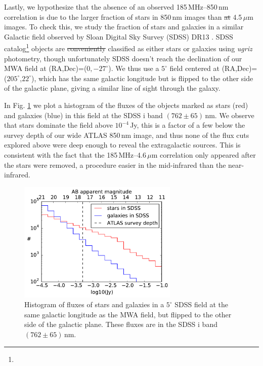 \documentclass[numberedappendix]{emulateapj}
\providecommand{\DIFadd}[1]{{\protect\color{blue}\uwave{#1}}} %
\providecommand{\DIFdel}[1]{{\protect\color{red}\sout{#1}}}                      %
\providecommand{\DIFaddbegin}{} %
\providecommand{\DIFaddend}{} %
\providecommand{\DIFdelbegin}{} %
\providecommand{\DIFdelend}{} %
\begin{document}
Lastly, we hypothesize that the absence of an observed 185\,MHz--850\,nm correlation is due to the larger fraction of stars in 850\,nm images than \DIFdelbegin \DIFdel{at }\DIFdelend \DIFaddbegin \DIFadd{in }\DIFaddend 4.5\,$\mu$m images. To check this, we study the fraction of stars and galaxies in a similar Galactic field observed by Sloan Digital Sky Survey (SDSS) \citep{sdssiii} DR13 \citep{sdssdr13}. SDSS catalog\footnote{} objects are \DIFdelbegin \DIFdel{conveniently }\DIFdelend classified as either stars or galaxies using \textit{ugriz} photometry, though unfortunately SDSS doesn't reach the declination of our MWA field at (RA,Dec)=($0,-27^\circ$). We thus use a $5^\circ$ field centered at (RA,Dec)=($205^\circ$,$22^\circ$), which has the same galactic longitude but is flipped to the other side of the galactic plane, giving a similar line of sight through the galaxy.

In Fig. \ref{fig:sdssstarsgals} we plot a histogram of the fluxes of the objects marked as stars (red) and galaxies (blue) in this field at the SDSS i band $(762\pm65)$\,nm. We observe that stars dominate the field above  $10^{-4}$\,Jy, this is a factor of a few below the survey depth of our wide ATLAS 850\,nm image, and thus none of the flux cuts explored above were deep enough to reveal the extragalactic sources. This is consistent with the fact that the 185\,MHz--4.6\,$\mu$m correlation only appeared after the stars were removed, a procedure easier in the mid-infrared than the near-infrared. 

\begin{figure}[h]
\centering
\includegraphics[width=3in]{sdss_stars_galaxies_hist_l=15_b=78_500000sources.pdf}
\caption[Histogram of SDSS fluxes of stars and galaxies in a similar field to our ATLAS field.]{Histogram of fluxes of stars and galaxies in a $5^\circ$ SDSS field at the same galactic longitude as the MWA field, but flipped to the other side of the galactic plane. These fluxes are in the SDSS i band $(762\pm65)$\,nm. }
\label{fig:sdssstarsgals}
\end{figure}
\end{document}
